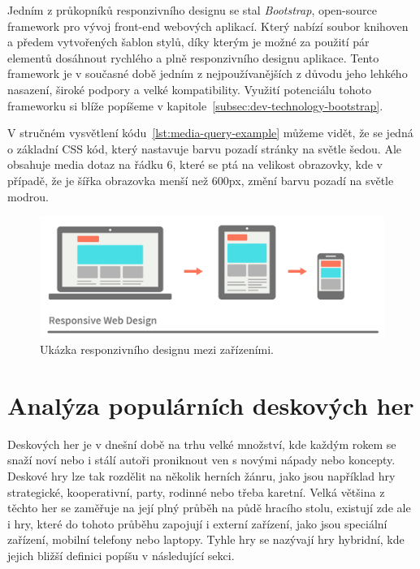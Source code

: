 Jedním z průkopníků responzivního designu se stal \textit{Bootstrap}, open-source framework pro vývoj front-end webových aplikací. Který nabízí soubor knihoven a předem vytvořených šablon stylů, díky kterým je možné za použití pár elementů dosáhnout rychlého a plně responzivního designu aplikace. Tento framework je v současné době jedním z nejpoužívanějších z důvodu jeho lehkého nasazení, široké podpory a velké kompatibility. Využití potenciálu tohoto frameworku si blíže popíšeme v kapitole~\ref{subsec:dev-technology-bootstrap}.



V stručném vysvětlení kódu~\ref{lst:media-query-example} můžeme vidět, že se jedná o základní CSS kód, který nastavuje barvu pozadí stránky na světle šedou. Ale obsahuje media dotaz na řádku 6, které se ptá na velikost obrazovky, kde v případě, že je šířka obrazovka menší než 600px, změní barvu pozadí na světle modrou.

\begin{figure}[H]
    \centering
    \includegraphics[width=1.0\textwidth]{figures/responsiveDesign}
    \caption{Ukázka responzivního designu mezi zařízeními. \cite{responsive_design}}
    \label{fig:responsive-design-example}
\end{figure}

\section{Analýza populárních deskových her}
\label{sec:popular-board-games-analysis}
Deskových her je v dnešní době na trhu velké množství, kde každým rokem se snaží noví nebo i stálí autoři proniknout ven s novými nápady nebo koncepty. Deskové hry lze tak rozdělit na několik herních žánru, jako jsou například hry strategické, kooperativní, party, rodinné nebo třeba karetní. Velká většina z těchto her se zaměřuje na její plný průběh na půdě hracího stolu, existují zde ale i hry, které do tohoto průběhu zapojují i externí zařízení, jako jsou speciální zařízení, mobilní telefony nebo laptopy. Tyhle hry se nazývají hry hybridní, kde jejich bližší definici popíšu v následující sekci.

